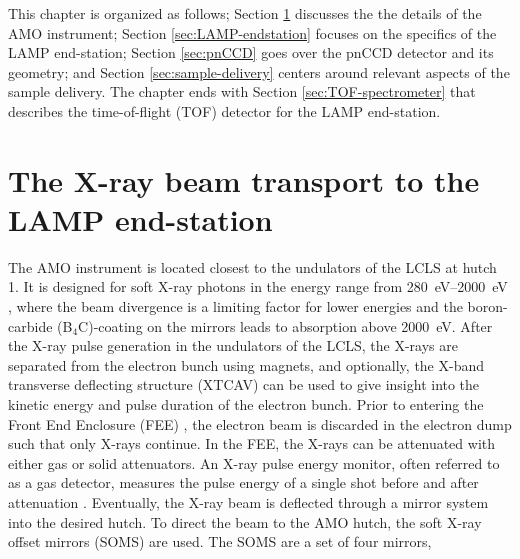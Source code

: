 %
This chapter is organized as follows; Section \ref{sec:amo-instrument} discusses the the details of the AMO instrument; Section \ref{sec:LAMP-endstation} focuses on the specifics of the LAMP end-station; Section \ref{sec:pnCCD} goes over the pnCCD detector and its geometry; and Section \ref{sec:sample-delivery} centers around relevant aspects of the sample delivery. The chapter ends with Section \ref{sec:TOF-spectrometer} that describes the time-of-flight (TOF) detector for the LAMP end-station.
%
%
%
\section{The X-ray beam transport to the LAMP end-station}\label{sec:amo-instrument}
The AMO instrument is located closest to the undulators of the LCLS at hutch 1. It is designed for soft X-ray photons in the energy range from \SIrange{280}{2000}{\electronvolt} \citep{Ferguson-2015-JSR,Bozek-2009-EPJST}, where the beam divergence is a limiting factor for lower energies and the boron-carbide (B$_{4}$C)-coating on the mirrors leads to absorption above \SI{2000}{\electronvolt}. After the X-ray pulse generation in the undulators of the LCLS, the X-rays are separated from the electron bunch using magnets, and optionally, the X-band transverse deflecting structure (XTCAV) \citep{Behrens-2014-NatCom} can be used to give insight into the kinetic energy and pulse duration of the electron bunch. Prior to entering the Front End Enclosure (FEE) \citep{Moeller-2011-NIMPR}, the electron beam is discarded in the electron dump such that only X-rays continue. In the FEE, the X-rays can be attenuated with either gas or solid attenuators. An X-ray pulse energy monitor, often referred to as a gas detector, measures the pulse energy of a single shot before and after attenuation \citep{Hau-Riege-2010-PRL-2}. Eventually, the X-ray beam is deflected through a mirror system into the desired hutch. To direct the beam to the AMO hutch, the soft X-ray offset mirrors (SOMS) are used. The SOMS are a set of four mirrors, 

